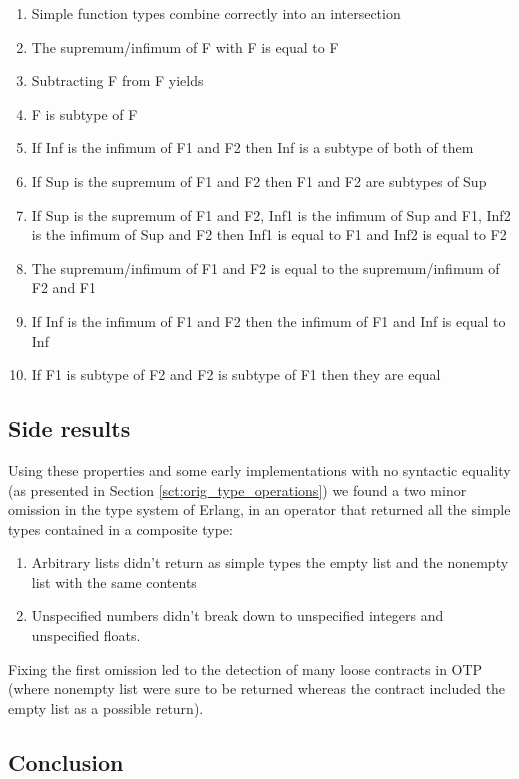 \begin{enumerate}
\item Simple function types combine correctly into an intersection
\item The supremum/infimum of F with F is equal to F
\item Subtracting F from F yields \none
\item F is subtype of F
\item If Inf is the infimum of F1 and F2 then Inf is a subtype of both of
  them
\item If Sup is the supremum of F1 and F2 then F1 and F2 are subtypes of
  Sup
\item If Sup is the supremum of F1 and F2, Inf1 is the infimum of Sup
  and F1, Inf2 is the infimum of Sup and F2 then Inf1 is equal to F1
  and Inf2 is equal to F2
\item The supremum/infimum of F1 and F2 is equal to the
  supremum/infimum of F2 and F1
\item If Inf is the infimum of F1 and F2 then the infimum of F1 and
  Inf is equal to Inf
\item If F1 is subtype of F2 and F2 is subtype of F1 then they are equal
\end{enumerate}

\subsection{Side results}

Using these properties and some early implementations with no
syntactic equality (as presented in Section
\ref{sct:orig_type_operations}) we found a two minor omission in the
type system of Erlang, in an operator that returned all the simple types
contained in a composite type:
\begin{enumerate}
\item Arbitrary lists didn't return as simple types the empty list and
  the nonempty list with the same contents
\item Unspecified numbers didn't break down to unspecified integers
  and unspecified floats.
\end{enumerate}

Fixing the first omission led to the detection of many loose contracts
in OTP (where nonempty list were sure to be returned whereas the
contract included the empty list as a possible return).

\subsection{Conclusion}

